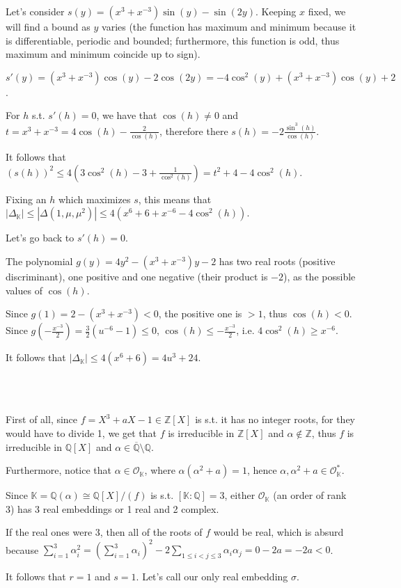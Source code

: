 \documentclass{article}
\newcommand{\numberset}{\mathbb}
\newcommand{\Z}{\numberset{Z}}
\newcommand{\Q}{\numberset{Q}}
\newcommand{\K}{\numberset{K}}
\newcommand{\exercise}[1]{\noindent {\bf Exercise #1}}
\begin{document}
Let's consider $s(y)=(x^3+x^{-3})\sin(y)-\sin(2y)$. Keeping $x$ fixed, we will find a bound as $y$ varies (the function has maximum and minimum because it is differentiable, periodic and bounded; furthermore, this function is odd, thus maximum and minimum coincide up to sign).

$s'(y)=(x^3+x^{-3})\cos(y)-2\cos(2y)=-4\cos^2(y)+(x^3+x^{-3})\cos(y)+2$.

For $h$ s.t. $s'(h)=0$, we have that $\cos(h)\neq 0$ and $t=x^3+x^{-3}=4\cos(h)-\frac{2}{\cos(h)}$, therefore there $s(h)=-2\frac{\sin^3(h)}{\cos(h)}$.

It follows that $(s(h))^2\leq 4(3\cos^2(h)-3+\frac{1}{\cos^2(h)})=t^2+4-4\cos^2(h)$.

Fixing an $h$ which maximizes $s$, this means that $|\Delta_{\K}|\leq|\Delta(1,\mu,\mu^2)|\leq 4(x^6+6+x^{-6}-4\cos^2(h))$.

Let's go back to $s'(h)=0$.

The polynomial $g(y)=4y^2-(x^3+x^{-3})y-2$ has two real roots (positive discriminant), one positive and one negative (their product is $-2$), as the possible values of $\cos(h)$.

Since $g(1)=2-(x^3+x^{-3})<0$, the positive one is $>1$, thus $\cos(h)<0$. Since $g(-\frac{x^{-3}}{2})=\frac{3}{2}(u^{-6}-1)\leq 0$, $\cos(h)\leq -\frac{x^{-3}}{2}$, i.e. $4\cos^2(h)\geq x^{-6}$.

It follows that $|\Delta_{\K}|\leq 4(x^6+6)=4u^3+24$.


~\\~\\
\exercise{22}

First of all, since $f=X^3+aX-1\in\Z[X]$ is s.t. it has no integer roots, for they would have to divide 1, we get that $f$ is irreducible in $\Z[X]$ and $\alpha\not\in\Z$, thus $f$ is irreducible in $\Q[X]$ and $\alpha\in\overline{\Q}\setminus\Q$.

Furthermore, notice that $\alpha\in\mathcal{O}_{\K}$, where $\alpha(\alpha^2+a)=1$, hence $\alpha,\alpha^2+a\in\mathcal{O}^*_{\K}$.

Since $\K=\Q(\alpha)\cong\Q[X]/(f)$ is s.t. $[\K:\Q]=3$, either $\mathcal{O}_{\K}$ (an order of rank 3) has 3 real embeddings or 1 real and 2 complex.

If the real ones were 3, then all of the roots of $f$ would be real, which is absurd because $\sum_{i=1}^3 \alpha^2_i=(\sum_{i=1}^3\alpha_i)^2-2\sum_{1\leq i<j\leq 3} \alpha_i\alpha_j=0-2a=-2a<0$.

It follows that $r=1$ and $s=1$. Let's call our only real embedding $\sigma$.
\end{document}
